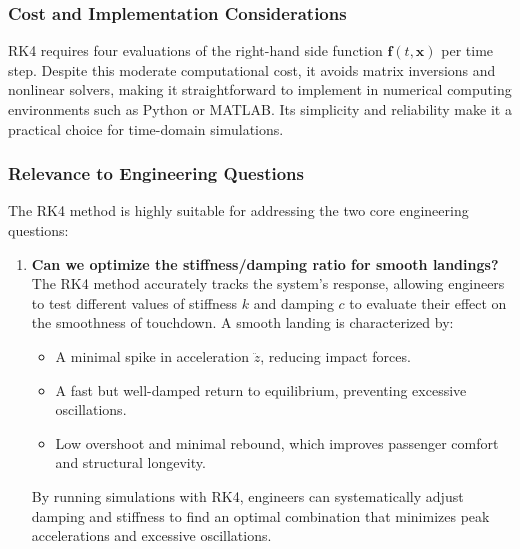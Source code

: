 \documentclass[12pt,letterpaper, onecolumn]{exam}
\begin{document}
\begin{questions}
\begin{solution}
\begin{parts}
\subsubsection*{Cost and Implementation Considerations}

RK4 requires four evaluations of the right-hand side function \( \mathbf{f}(t, \mathbf{x}) \) per time step. Despite this moderate computational cost, it avoids matrix inversions and nonlinear solvers, making it straightforward to implement in numerical computing environments such as Python or MATLAB. Its simplicity and reliability make it a practical choice for time-domain simulations.

\subsubsection*{Relevance to Engineering Questions}

The RK4 method is highly suitable for addressing the two core engineering questions:

\begin{enumerate}
    \item \textbf{Can we optimize the stiffness/damping ratio for smooth landings?} \\
    The RK4 method accurately tracks the system’s response, allowing engineers to test different values of stiffness \( k \) and damping \( c \) to evaluate their effect on the smoothness of touchdown. A smooth landing is characterized by:
    \begin{itemize}
        \item A minimal spike in acceleration \( \ddot{z} \), reducing impact forces.
        \item A fast but well-damped return to equilibrium, preventing excessive oscillations.
        \item Low overshoot and minimal rebound, which improves passenger comfort and structural longevity.
    \end{itemize}
    By running simulations with RK4, engineers can systematically adjust damping and stiffness to find an optimal combination that minimizes peak accelerations and excessive oscillations.


\end{enumerate}
\end{parts}
\end{solution}
\end{questions}
\end{document}
